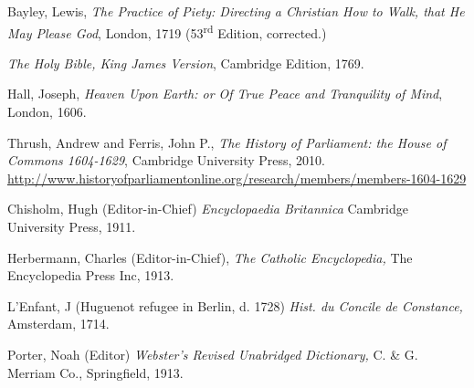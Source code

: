 \begin{thebibliography}{56}
        Bayley, Lewis,
        \textit{The Practice of Piety: Directing a Christian How to Walk, that He May Please God},
        London,
        1719 (53\textsuperscript{rd} Edition, corrected.)

        \textit{The Holy Bible, King James Version},
        Cambridge Edition,
        1769.

        Hall, Joseph,
        \textit{Heaven Upon Earth: or Of True Peace and Tranquility of Mind},
        London,
        1606.

        Thrush, Andrew and Ferris, John P.,
        \textit{The History of Parliament: the House of Commons 1604-1629},
        Cambridge University Press,
        2010.
        \url{http://www.historyofparliamentonline.org/research/members/members-1604-1629}

        Chisholm, Hugh (Editor-in-Chief)
        \textit{Encyclopaedia Britannica}
        Cambridge University Press,
        1911.

        Herbermann, Charles (Editor-in-Chief),
        \textit{The Catholic Encyclopedia,}
        The Encyclopedia Press Inc,
        1913.
    
        L'Enfant, J (Huguenot refugee in Berlin, d. 1728)
        \textit{Hist. du Concile de Constance,} 
        Amsterdam, 
        1714.

        Porter, Noah (Editor)
        \textit{Webster's Revised Unabridged Dictionary,}
        C. \& G. Merriam Co., Springfield, 
        1913.
        
\end{thebibliography}